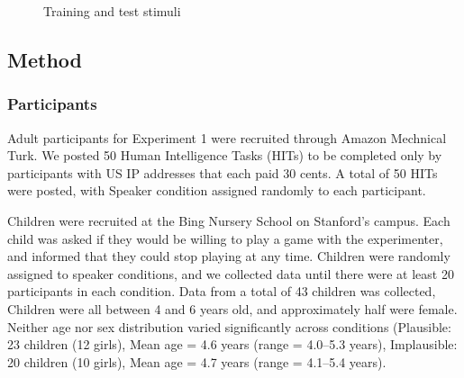 \documentclass[man,floatsintext]{apa6}
\begin{document}
\begin{figure}[t]
     \begin{center}
    \end{center}
    \caption{Training and test stimuli
     }%
   \label{fig:stimuli}
\end{figure}


\subsection{Method}
\subsubsection{Participants}

Adult participants for Experiment 1 were recruited through Amazon Mechnical Turk. We posted 50 Human Intelligence Tasks (HITs) to be completed only by participants with US IP addresses that each paid 30 cents. A total of 50 HITs were posted, with Speaker condition assigned randomly to each participant.

Children were recruited at the Bing Nursery School on Stanford's campus. Each child was asked if they would be willing to play a game with the experimenter, and informed that they could stop playing at any time. Children were randomly assigned to speaker conditions, and we collected data until there were at least 20 participants in each condition. Data from a total of 43 children was collected, Children were all between 4 and 6 years old, and approximately half were female. Neither age nor sex distribution varied significantly across conditions (Plausible: 23 children (12 girls), Mean age = 4.6 years (range = 4.0--5.3 years), Implausible: 20 children (10 girls), Mean age = 4.7 years (range = 4.1--5.4 years).
\end{document}

